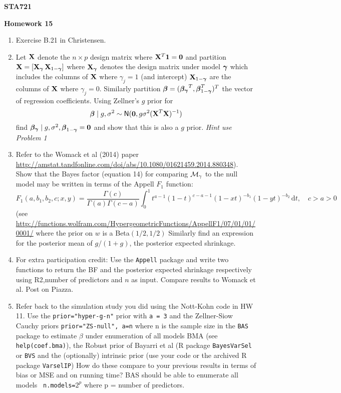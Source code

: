 \documentclass[12pt]{article}
\begin{document}
{\bf STA721}
\vspace{.1in}
\begin{center}
{\large \bf Homework 15} \\
\end{center}
\vspace{.5in}
\noindent
\begin{enumerate}
\item Exercise B.21 in Christensen. 
\item Let $\mathbf{X}$ denote the $n \times p$ design matrix where
  $\mathbf{X}^T \mathbf{1} = \mathbf{0}$ and partition $\mathbf{X} = [\mathbf{X}_{\boldsymbol{\gamma}} \, \mathbf{X}_{1-\boldsymbol{\gamma}}]$ where
  $\mathbf{X}_{\boldsymbol{\gamma}}$ denotes the design matrix under model $\boldsymbol{\gamma}$ which includes the
  columns of $\mathbf{X}$ where $\gamma_j = 1$ (and intercept) $\mathbf{X}_{1-\boldsymbol{\gamma}}$ are
  the columns of $\mathbf{X}$ where $\gamma_j = 0$.  Similarly partition
  $\boldsymbol{\beta} = (\boldsymbol{\beta_\gamma}^T, \boldsymbol{\beta}_{1-\boldsymbol{\gamma}}^T)^T$ the vector of regression coefficients.
  Using Zellner's $g$ prior for
  $$\boldsymbol{\beta} \mid g, \sigma^2 \sim \textsf{N}(\mathbf{0}, g \sigma^2 (\mathbf{X}^T\mathbf{X})^{-1})$$
  find $\boldsymbol{\beta_\gamma} \mid g, \sigma^2, \boldsymbol{\beta}_{1 - \boldsymbol{\gamma}} = \mathbf{0}$ and show that this is
  also a $g$ prior.   {\it Hint use Problem 1}
 

\item Refer to the Womack et al (2014) paper
  \url{http://amstat.tandfonline.com/doi/abs/10.1080/01621459.2014.880348}).
  Show that the Bayes factor (equation 14) for comparing ${\cal M}_\gamma$ to the
  null model may   be written in terms of the Appell $F_1$ function:
$$
F_1(a,b_1,b_2,c; x,y) = \frac{\Gamma(c)} {\Gamma(a) \Gamma(c-a)} 
\int_0^1 t^{a-1} (1-t)^{c-a-1} (1-xt)^{-b_1} (1-yt)^{-b_2} \,\mathrm{d}t, 
\quad c > a > 0 
$$
(see
\url{http://functions.wolfram.com/HypergeometricFunctions/AppellF1/07/01/01/0001/}  where the prior on $w$ is a Beta$(1/2, 1/2)$
Similarly find an expression for the posterior mean of $g/(1+g)$, the
posterior expected shrinkage.


\item For extra participation credit: Use the {\tt  Appell}
  package and write two functions to return the BF and the posterior expected
  shrinkage respectively using R2,number of predictors and $n$ as
  input.   Compare results to Womack et al. Post on Piazza.

  
\item Refer back to the simulation study you did using the Nott-Kohn
  code in HW 11.  Use the {\tt prior="hyper-g-n"} prior with {\tt a =
    3} and the Zellner-Siow Cauchy priors {\tt prior="ZS-null", a=n}
  where n is the sample size in the {\tt BAS} package to estimate
  $\beta$ under enumeration of all models BMA (see
  {\tt help(coef.bma)}), the Robust prior of Bayarri et al (R package
  {\tt BayesVarSel} or {\tt BVS} and the (optionally) intrinsic prior
  (use your code or the archived R package {\tt VarselIP}) How do
  these compare to your previous results in terms of bias or MSE and
  on running time?  BAS should be able to enumerate all models {\tt
    n.models=}$2^p$ where p = number of predictors.

\end{enumerate}
\end{document}
